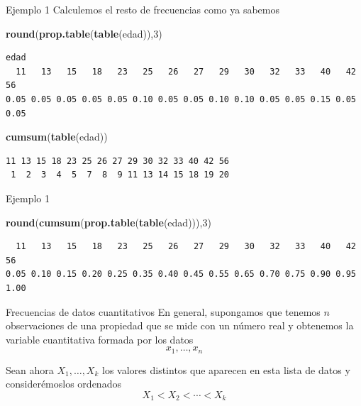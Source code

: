 \documentclass[
  ignorenonframetext,
  aspectratio=169]{beamer}
\newenvironment{Shaded}{\begin{snugshade}}{\end{snugshade}}
\newcommand{\DecValTok}[1]{\textcolor[rgb]{0.00,0.00,0.81}{#1}}
\newcommand{\FunctionTok}[1]{\textcolor[rgb]{0.13,0.29,0.53}{\textbf{#1}}}
\newcommand{\NormalTok}[1]{#1}
\begin{document}
\begin{frame}[fragile]{Ejemplo 1}
\label{ejemplo-1-5}
Calculemos el resto de frecuencias como ya sabemos

\begin{Shaded}
\begin{Highlighting}[]
\FunctionTok{round}\NormalTok{(}\FunctionTok{prop.table}\NormalTok{(}\FunctionTok{table}\NormalTok{(edad)),}\DecValTok{3}\NormalTok{)}
\end{Highlighting}
\end{Shaded}

\begin{verbatim}
edad
  11   13   15   18   23   25   26   27   29   30   32   33   40   42   56 
0.05 0.05 0.05 0.05 0.05 0.10 0.05 0.05 0.10 0.10 0.05 0.05 0.15 0.05 0.05 
\end{verbatim}

\begin{Shaded}
\begin{Highlighting}[]
\FunctionTok{cumsum}\NormalTok{(}\FunctionTok{table}\NormalTok{(edad))}
\end{Highlighting}
\end{Shaded}

\begin{verbatim}
11 13 15 18 23 25 26 27 29 30 32 33 40 42 56 
 1  2  3  4  5  7  8  9 11 13 14 15 18 19 20 
\end{verbatim}
\end{frame}

\begin{frame}[fragile]{Ejemplo 1}
\label{ejemplo-1-6}
\begin{Shaded}
\begin{Highlighting}[]
\FunctionTok{round}\NormalTok{(}\FunctionTok{cumsum}\NormalTok{(}\FunctionTok{prop.table}\NormalTok{(}\FunctionTok{table}\NormalTok{(edad))),}\DecValTok{3}\NormalTok{)}
\end{Highlighting}
\end{Shaded}

\begin{verbatim}
  11   13   15   18   23   25   26   27   29   30   32   33   40   42   56 
0.05 0.10 0.15 0.20 0.25 0.35 0.40 0.45 0.55 0.65 0.70 0.75 0.90 0.95 1.00 
\end{verbatim}
\end{frame}

\begin{frame}{Frecuencias de datos cuantitativos}
\label{frecuencias-de-datos-cuantitativos-1}
En general, supongamos que tenemos \(n\) observaciones de una propiedad
que se mide con un número real y obtenemos la variable cuantitativa
formada por los datos \[x_1,\dots, x_n\]

Sean ahora \(X_1,\dots,X_k\) los valores distintos que aparecen en esta
lista de datos y considerémoslos ordenados \[X_1<X_2<\cdots<X_k\]
\end{frame}
\end{document}
